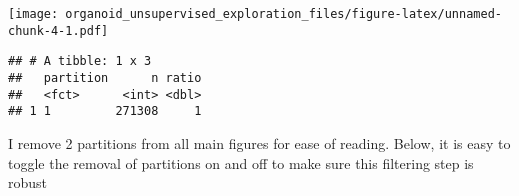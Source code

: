 \documentclass[
]{article}
\newenvironment{Shaded}{\begin{snugshade}}{\end{snugshade}}
\newcommand{\DataTypeTok}[1]{\textcolor[rgb]{0.13,0.29,0.53}{#1}}
\newcommand{\KeywordTok}[1]{\textcolor[rgb]{0.13,0.29,0.53}{\textbf{#1}}}
\newcommand{\NormalTok}[1]{#1}
\newcommand{\OperatorTok}[1]{\textcolor[rgb]{0.81,0.36,0.00}{\textbf{#1}}}
\newcommand{\StringTok}[1]{\textcolor[rgb]{0.31,0.60,0.02}{#1}}
\begin{document}
\texttt{[image: organoid\_unsupervised\_exploration\_files/figure-latex/unnamed-chunk-4-1.pdf]}

\begin{Shaded}
\end{Shaded}

\begin{verbatim}
## # A tibble: 1 x 3
##   partition      n ratio
##   <fct>      <int> <dbl>
## 1 1         271308     1
\end{verbatim}

I remove 2 partitions from all main figures for ease of reading. Below,
it is easy to toggle the removal of partitions on and off to make sure
this filtering step is robust
\end{document}
